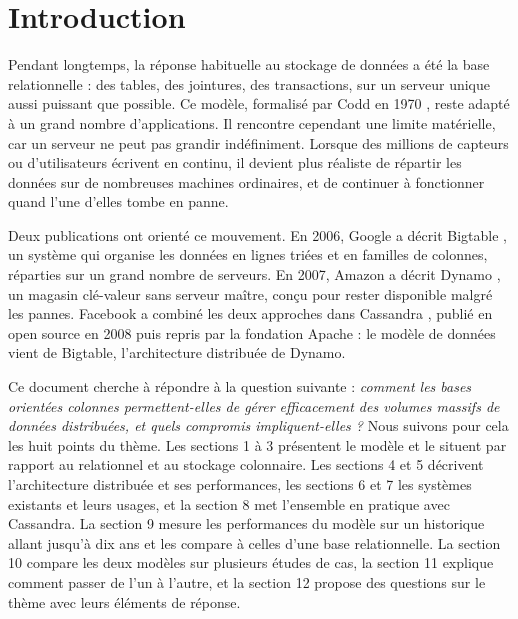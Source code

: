 \documentclass[11pt,a4paper]{article}
\begin{document}
\tableofcontents
\newpage

\section*{Introduction}

Pendant longtemps, la réponse habituelle au stockage de données a été la base relationnelle : des tables, des jointures, des transactions, sur un serveur unique aussi puissant que possible. Ce modèle, formalisé par Codd en 1970 \cite{codd}, reste adapté à un grand nombre d'applications. Il rencontre cependant une limite matérielle, car un serveur ne peut pas grandir indéfiniment. Lorsque des millions de capteurs ou d'utilisateurs écrivent en continu, il devient plus réaliste de répartir les données sur de nombreuses machines ordinaires, et de continuer à fonctionner quand l'une d'elles tombe en panne.

Deux publications ont orienté ce mouvement. En 2006, Google a décrit Bigtable \cite{bigtable}, un système qui organise les données en lignes triées et en familles de colonnes, réparties sur un grand nombre de serveurs. En 2007, Amazon a décrit Dynamo \cite{dynamo}, un magasin clé-valeur sans serveur maître, conçu pour rester disponible malgré les pannes. Facebook a combiné les deux approches dans Cassandra \cite{cassandra}, publié en open source en 2008 puis repris par la fondation Apache : le modèle de données vient de Bigtable, l'architecture distribuée de Dynamo.

Ce document cherche à répondre à la question suivante : \emph{comment les bases orientées colonnes permettent-elles de gérer efficacement des volumes massifs de données distribuées, et quels compromis impliquent-elles ?} Nous suivons pour cela les huit points du thème. Les sections 1 à 3 présentent le modèle et le situent par rapport au relationnel et au stockage colonnaire. Les sections 4 et 5 décrivent l'architecture distribuée et ses performances, les sections 6 et 7 les systèmes existants et leurs usages, et la section 8 met l'ensemble en pratique avec Cassandra. La section 9 mesure les performances du modèle sur un historique allant jusqu'à dix ans et les compare à celles d'une base relationnelle. La section 10 compare les deux modèles sur plusieurs études de cas, la section 11 explique comment passer de l'un à l'autre, et la section 12 propose des questions sur le thème avec leurs éléments de réponse.
\end{document}
